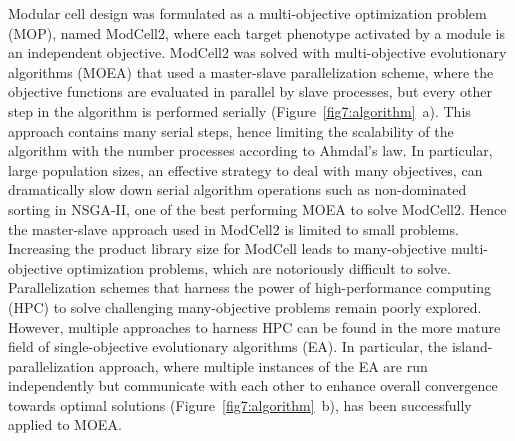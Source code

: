 \documentclass[12pt]{article}
\begin{document}
Modular cell design was formulated as a multi-objective optimization problem (MOP), named ModCell2, where each target phenotype activated by a module is an independent objective.\citep{garcia2019}
ModCell2 was solved with multi-objective evolutionary algorithms (MOEA) that used a master-slave parallelization scheme, where the objective functions are evaluated in parallel by slave processes, but every other step in the algorithm is performed serially (Figure~\ref{fig7:algorithm}~a).\citep{garcia2019, garcia2019c}
This approach contains many serial steps, hence limiting the scalability of the algorithm with the number processes according to Ahmdal's law.\citep{hill2008}
In particular, large population sizes, an effective strategy to deal with many objectives,\citep{garcia2019c,ishibuchi2009} can dramatically slow down serial algorithm operations such as non-dominated sorting in NSGA-II, \citep{deb2002} one of the best performing MOEA to solve ModCell2.\citep{garcia2019c}
Hence the master-slave approach used in ModCell2 is limited to small problems.
Increasing the product library size for ModCell leads to many-objective multi-objective optimization problems, which are notoriously difficult to solve.\citep{ishibuchi2008, li2018}
Parallelization schemes that harness the power of high-performance computing (HPC) to solve challenging many-objective problems remain poorly explored.
However, multiple approaches to harness HPC can be found in the more mature field of single-objective evolutionary algorithms (EA). \citep{alba2013}
In particular, the island-parallelization approach, where multiple instances of the EA are run independently but communicate with each other to enhance overall convergence towards optimal solutions (Figure~\ref{fig7:algorithm}~b), has been successfully applied to MOEA.\citep{martens2013, jozefowiez2005, garcia2016}



%

%
\end{document}
